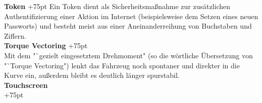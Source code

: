 \documentclass[fontsize = 12pt, paper = a4]{scrreprt}
\begin{document}
\textbf{Token}
\hangindent+75pt  
\hspace*{12mm}
Ein Token dient als Sicherheitsmaßnahme zur zusätzlichen Authentifizierung einer Aktion im Internet (beispielsweise dem Setzen eines neuen Passworts) und besteht meist aus einer Aneinanderreihung von Buchstaben und Ziffern.\\

\textbf{Torque Vectoring}
\hangindent+75pt  \\
Mit dem "`gezielt eingesetztem Drehmoment" (so die wörtliche Übersetzung von "`Torque Vectoring") lenkt das Fahrzeug noch spontaner und direkter in die Kurve ein, außerdem bleibt es deutlich länger spurstabil.\\

\textbf{Touchscreen} \\
\hangindent+75pt  
\end{document}
